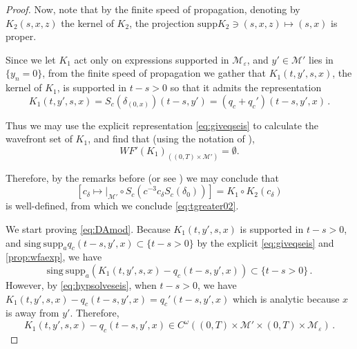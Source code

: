 \documentclass[
	fontsize=11pt, 
	twoside=false, 
	abstract=true, 
	a4paper,
]{scrartcl}
\newcommand{\eps}{\varepsilon}
\newcommand{\dd}{\mathrm{d}}
\newcommand{\supp}{\mathrm{supp}}
\begin{document}
\begin{proof}
	Now, note that by the finite speed of propagation, denoting by $K_2(s,x,z)$ the kernel of $K_2$, the projection $\supp K_2 \ni (s,x,z) \mapsto (s,x)$ is proper. 

	Since we let $K_1$ act only on expressions supported in $\mathcal{M}_\eps$, and $y' \in \mathcal{M}'$ lies in $\{y_n=0\}$, from the finite speed of propagation we gather that $K_1(t,y',s,x)$, the kernel of $K_1$, is supported in $t-s>0$ so that it admits the representation
	\[
		K_1(t,y',s,x) = S_c(\delta_{(0,x)})(t-s,y') = (q_c+q_c')(t-s,y',x)\,.
	\]

	Thus we may use the explicit representation \cref{eq:giveqseis} to calculate the wavefront set of $K_1$, and find that (using the notation of \cite[\S~8.2]{hoermander1}),
	\[
		WF'(K_1)_{((0,T)\times\mathcal{M}')} = \emptyset.
	\]

	Therefore, by the remarks before \cite[Thm.~8.2.14]{hoermander1} (or see \cite[Thm.~1.3.7]{zbMATH05817029}) we may conclude that 
	\[
		\left[c_\delta \mapsto \vert_{\mathcal{M}'} \circ S_{c}(c^{-3}c_\delta S_{c}(\delta_0))\right] = K_1 \circ K_2 (c_\delta) %
	\]
	is well-defined, from which we conclude \cref{eq:tgreater02}. 

	We start proving \cref{eq:DAmod}. Because $K_1(t,y',s,x)$ is supported in $t-s>0$, and $\mathrm{sing}\ \mathrm{supp}_a q_c(t-s,y',x) \subset \{t-s>0\}$ by the explicit \cref{eq:giveqseis} and \cref{prop:wfaexp}, we have %
	\[
		\mathrm{sing}\ \mathrm{supp}_a \left(K_1 (t,y',s,x) -  q_c(t-s,y',x)\right) \subset \{t-s>0\}\,.
	\]
	However, by \cref{eq:hypsolveseis}, when $t-s>0$, we have $K_1 (t,y',s,x) - q_c(t-s,y',x) = q_c'(t-s,y',x)$ which is analytic because $x$ is away from $y'$. Therefore,
	\begin{equation}\label{eq:K1toqc}
		K_1(t,y',s,x) - q_c(t-s,y',x) %
		\in C^\omega((0,T)\times\mathcal{M}'\times (0,T)\times\mathcal{M}_\eps)\,.
	\end{equation}


\end{proof}
\end{document}
